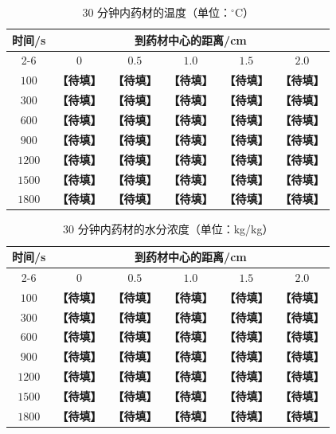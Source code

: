 \documentclass[12pt,a4paper]{article}
\newcommand{\ph}[1]{\textbf{【#1】}}                                   %
\begin{document}
\begin{table}[H]
\centering
\caption{30 分钟内药材的温度（单位：$^\circ$C）}
\label{tab:q1-temperature}
\begin{tabular}{cccccc}
\toprule
\multirow{2}{*}{时间/s} & \multicolumn{5}{c}{到药材中心的距离/cm}\\
\cmidrule(lr){2-6}
 & $0$ & $0.5$ & $1.0$ & $1.5$ & $2.0$\\
\midrule
$100$  & \ph{待填} & \ph{待填} & \ph{待填} & \ph{待填} & \ph{待填}\\
$300$  & \ph{待填} & \ph{待填} & \ph{待填} & \ph{待填} & \ph{待填}\\
$600$  & \ph{待填} & \ph{待填} & \ph{待填} & \ph{待填} & \ph{待填}\\
$900$  & \ph{待填} & \ph{待填} & \ph{待填} & \ph{待填} & \ph{待填}\\
$1200$ & \ph{待填} & \ph{待填} & \ph{待填} & \ph{待填} & \ph{待填}\\
$1500$ & \ph{待填} & \ph{待填} & \ph{待填} & \ph{待填} & \ph{待填}\\
$1800$ & \ph{待填} & \ph{待填} & \ph{待填} & \ph{待填} & \ph{待填}\\
\bottomrule
\end{tabular}
\end{table}

\begin{table}[H]
\centering
\caption{30 分钟内药材的水分浓度（单位：kg/kg）}
\label{tab:q1-moisture}
\begin{tabular}{cccccc}
\toprule
\multirow{2}{*}{时间/s} & \multicolumn{5}{c}{到药材中心的距离/cm}\\
\cmidrule(lr){2-6}
 & $0$ & $0.5$ & $1.0$ & $1.5$ & $2.0$\\
\midrule
$100$  & \ph{待填} & \ph{待填} & \ph{待填} & \ph{待填} & \ph{待填}\\
$300$  & \ph{待填} & \ph{待填} & \ph{待填} & \ph{待填} & \ph{待填}\\
$600$  & \ph{待填} & \ph{待填} & \ph{待填} & \ph{待填} & \ph{待填}\\
$900$  & \ph{待填} & \ph{待填} & \ph{待填} & \ph{待填} & \ph{待填}\\
$1200$ & \ph{待填} & \ph{待填} & \ph{待填} & \ph{待填} & \ph{待填}\\
$1500$ & \ph{待填} & \ph{待填} & \ph{待填} & \ph{待填} & \ph{待填}\\
$1800$ & \ph{待填} & \ph{待填} & \ph{待填} & \ph{待填} & \ph{待填}\\
\bottomrule
\end{tabular}
\end{table}
\end{document}
